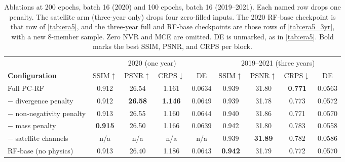 \documentclass[sigconf,nonacm]{acmart}
\newcommand{\pcrf}{\textsc{PC-RF}\xspace}
\begin{document}
\begin{table}[t]
\caption{Ablations at 200 epochs, batch 16 (2020) and 100 epochs, batch 16 (2019--2021). Each named row drops one penalty. The satellite arm (three-year only) drops four zero-filled inputs. The 2020 RF-base checkpoint is that row of \cref{tab:era5}, and the three-year full and RF-base checkpoints are those rows of \cref{tab:era5_3yr}, with a new 8-member sample. Zero NVR and MCE are omitted. DE is unmarked, as in \cref{tab:era5}. Bold marks the best SSIM, PSNR, and CRPS per block.}
\label{tab:ablation}
\centering
\begin{tabular}{lcccc@{\hspace{10pt}}cccc}
\toprule
 & \multicolumn{4}{c}{2020 (one year)} & \multicolumn{4}{c}{2019--2021 (three years)} \\
\cmidrule(lr){2-5}\cmidrule(lr){6-9}
\textbf{Configuration} & SSIM$\uparrow$ & PSNR$\uparrow$ & CRPS$\downarrow$ & DE & SSIM$\uparrow$ & PSNR$\uparrow$ & CRPS$\downarrow$ & DE \\
\midrule
Full \pcrf                  & 0.912 & 26.54 & 1.161 & 0.0634 & 0.939 & 31.80 & \textbf{0.771} & 0.0563 \\
$-$ divergence penalty      & 0.912 & \textbf{26.58} & \textbf{1.146} & 0.0649 & 0.939 & 31.78 & 0.773 & 0.0572 \\
$-$ non-negativity penalty  & 0.913 & 26.55 & 1.160 & 0.0644 & 0.940 & 31.86 & 0.771 & 0.0570 \\
$-$ mass penalty            & \textbf{0.915} & 26.50 & 1.166 & 0.0639 & 0.942 & 31.80 & 0.783 & 0.0558 \\
$-$ satellite channels      & n/a & n/a & n/a & n/a & 0.939 & \textbf{31.89} & 0.782 & 0.0586 \\
RF-base (no physics)        & 0.913 & 26.40 & 1.186 & 0.0643 & \textbf{0.942} & 31.79 & 0.772 & 0.0570 \\
\bottomrule
\end{tabular}
\end{table}
\end{document}
